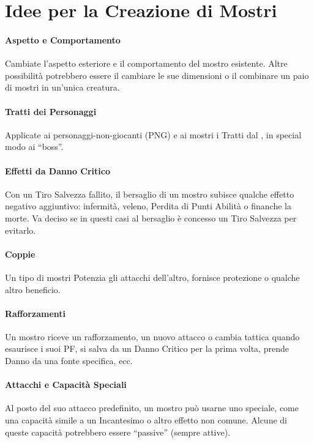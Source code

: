 \documentclass[itdr]{subfiles}
\begin{document}
\section{Idee per la Creazione di Mostri}

\paragraph{Aspetto e Comportamento}
Cambiate l'aspetto esteriore e il comportamento del mostro esistente. Altre possibilità potrebbero essere il cambiare le sue dimensioni o il combinare un paio di mostri in un'unica creatura.

\vfill
\paragraph{Tratti dei Personaggi}
Applicate ai personaggi-non-giocanti (PNG) e ai mostri i Tratti dal \textbf{}, in special modo ai ``boss''.

\vfill
\paragraph{Effetti da Danno Critico}
Con un Tiro Salvezza fallito, il bersaglio di un mostro subisce qualche effetto negativo aggiuntivo: infermità, veleno, Perdita di Punti Abilità o finanche la morte. Va deciso se in questi casi al bersaglio è concesso un Tiro Salvezza per evitarlo.

\vfill
\paragraph{Coppie}
Un tipo di mostri Potenzia gli attacchi dell'altro, fornisce protezione o qualche altro beneficio.

\vfill
\paragraph{Rafforzamenti}
Un mostro riceve un rafforzamento, un nuovo attacco o cambia tattica quando esaurisce i suoi PF, si salva da un Danno Critico per la prima volta, prende Danno da una fonte specifica, ecc.

\vfill
\paragraph{Attacchi e Capacità Speciali}
Al posto del suo attacco predefinito, un mostro può usarne uno speciale, come una capacità simile a un Incantesimo o altro effetto non comune. Alcune di queste capacità potrebbero essere ``passive'' (sempre attive).
\end{document}
